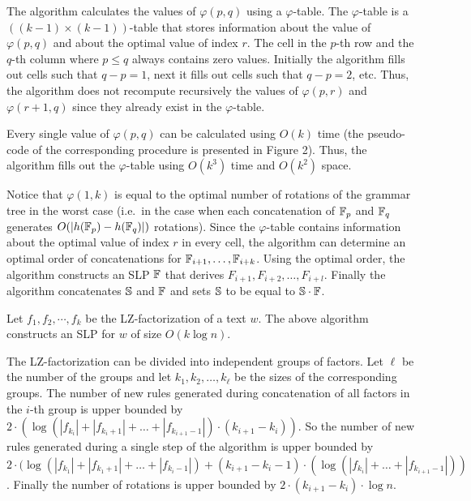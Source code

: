 ﻿\documentclass[10pt, conference, compsocconf]{IEEEtran}
\begin{document}
The algorithm calculates the values of $\varphi(p, q)$ using a $\varphi$-table.
The $\varphi$-table is a $((k-1) \times (k-1))$-table that stores information
about the value of $\varphi(p,q)$ and about the optimal value of index $r$. The
cell in the $p$-th row and the $q$-th column where $p \leq q$ always contains
zero values. Initially the algorithm fills out cells such that $q - p = 1$,
next it fills out cells such that $q - p = 2$, etc. Thus, the algorithm does
not recompute recursively the values of $\varphi(p, r)$ and $\varphi(r+1, q)$
since they already exist in the $\varphi$-table.

Every single value of $\varphi(p, q)$ can be calculated using $O(k)$ time (the
pseudo-code of the corresponding procedure is presented in Figure 2). Thus, the
algorithm fills out the $\varphi$-table using $O(k^3)$ time and $O(k^2)$ space.

\begin{figure}[th]
\ComputingFiValue
\end{figure}

Notice that $\varphi(1, k)$ is equal to the optimal number of rotations of the
grammar tree in the worst case (i.e.\ in the case when each concatenation of
$\mathbb{F}_p$ and $\mathbb{F}_q$ generates $O(|h(\mathbb{F}_p) - h(\mathbb{F}_q)|)$
rotations). Since the $\varphi$-table contains information about the optimal
value of index $r$ in every cell, the algorithm can determine an optimal order
of concatenations for $\mathbb{F}_{i+1}, \dots, \mathbb{F}_{i+k}$. Using the optimal
order, the algorithm constructs an SLP $\mathbb{F}$ that derives $F_{i+1},
F_{i+2}, \dots, F_{i+l}$. Finally the algorithm concatenates $\mathbb{S}$ and
$\mathbb{F}$ and sets $\mathbb{S}$ to be equal to $\mathbb{S} \cdot \mathbb{F}$.

\begin{thm}
Let $f_1, f_2, \cdots, f_k$ be the LZ-factorization of a text $w$. The above
algorithm constructs an SLP for $w$ of size $O(k\log n)$.
\end{thm}
\proof{} The LZ-factorization can be divided into independent groups of
factors. Let $\ell$ be the number of the groups and let $k_1, k_2, \dots,
k_\ell$ be the sizes of the corresponding groups. The number of new rules
generated during concatenation of all factors in the $i$-th group is upper
bounded by $2\cdot(\log (|f_{k_i}| + |f_{k_i + 1}| + \dots +
|f_{k_{i+1}-1}|)\cdot(k_{i+1} - k_i))$. So the number of new rules generated
during a single step of the algorithm is upper bounded by
$2\cdot(\log(|f_{k_1}| + |f_{k_1 + 1}| + \dots + |f_{k_i -1}|) + (k_{i+1} - k_i
- 1)\cdot(\log (|f_{k_i}| + \dots + |f_{k_{i+1}-1}|))$. Finally the number of
rotations is upper bounded by $2\cdot(k_{i+1} - k_i)\cdot \log n$.
\end{document}
